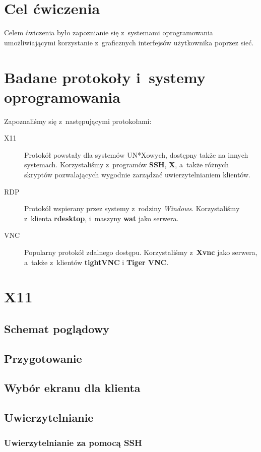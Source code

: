 \documentclass[a4paper]{article}
\newcommand{\ssh}{\textbf{SSH}}
\newcommand{\rdp}{\textbf{rdesktop}}
\newcommand{\xbin}{\textbf{X}}
\newcommand{\xvnc}{\textbf{Xvnc}}
\newcommand{\wat}{\textbf{wat}}
\begin{document}
\section{Cel ćwiczenia}
Celem ćwiczenia było zapoznianie się z~systemami oprogramowania umożliwiającymi korzystanie z~graficznych interfejsów użytkownika poprzez sieć.
\section{Badane protokoły i~systemy oprogramowania}
Zapoznaliśmy się z~następującymi protokołami:
\begin{description}
  \item[X11] Protokół powstały dla systemów UN*X\dywiz owych, dostępny także na innych systemach. Korzystaliśmy z~programów \ssh, \xbin,
    a~także różnych skryptów pozwalających wygodnie zarządzać uwierzytelnianiem klientów.
  \item[RDP] Protokół wspierany przez systemy z~rodziny \emph{Windows}. Korzystaliśmy z~klienta \rdp, i~maszyny \wat{} jako serwera.
  \item[VNC] Popularny protokół zdalnego dostępu. Korzystaliśmy z~\xvnc{} jako serwera, a~także z~klientów \textbf{tightVNC} i \textbf{Tiger VNC}.
\end{description}

\section{X11}
\subsection{Schemat poglądowy}
\subsection{Przygotowanie}
\subsection{Wybór ekranu dla klienta}
\subsection{Uwierzytelnianie}
\subsubsection{Uwierzytelnianie za pomocą SSH}
\end{document}
